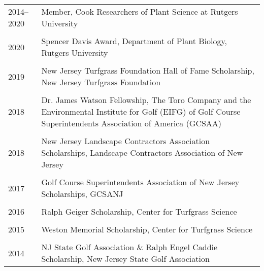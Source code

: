 \documentclass[letterpaper,11pt, english]{article}
\begin{document}
\begin{flushleft}
  \begin{tabularx}{\textwidth}{@{}lX@{}}
    2014--2020 \hspace{3.6cm} & Member, Cook Researchers of Plant Science at Rutgers University \\
      \\[-0.2cm] 
      2020 \hspace{3.6cm} & Spencer Davis Award, Department of Plant Biology, Rutgers University \\
      \\[-0.2cm] 
      2019 \hspace{3.6cm} & New Jersey Turfgrass Foundation Hall of Fame Scholarship, New Jersey Turfgrass Foundation \\
      \\[-0.2cm] 
      2018 \hspace{3.6cm} & Dr. James Watson Fellowship, The Toro Company and the Environmental Institute for Golf (EIFG) of Golf Course Superintendents Association of America (GCSAA) \\
      \\[-0.2cm] 
      2018 \hspace{3.6cm} & New Jersey Landscape Contractors Association Scholarships, Landscape Contractors Association of New Jersey \\
      \\[-0.2cm] 
      2017 \hspace{3.6cm} & Golf Course Superintendents Association of New Jersey Scholarships, GCSANJ \\
      \\[-0.2cm] 
      2016 \hspace{3.6cm} & Ralph Geiger Scholarship, Center for Turfgrass Science \\
      \\[-0.2cm] 
      2015 \hspace{3.6cm} & Weston Memorial Scholarship, Center for Turfgrass Science \\
      \\[-0.2cm] 
      2014 \hspace{3.6cm} & NJ State Golf Association \& Ralph Engel Caddie Scholarship, New Jersey State Golf Association \\
  \end{tabularx}
\end{flushleft}
  


\end{document}
